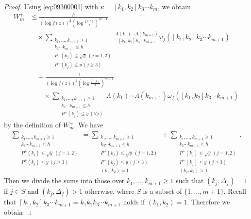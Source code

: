 \documentclass[a4paper,11pt]{amsart}
\theoremstyle{definition}
\numberwithin{equation}{section}
\begin{document}
\begin{proof}
Using \eqref{eq:09300001} with $\kappa=[k_1,k_2]k_3 \cdots k_m$, we obtain
\begin{align*}
W_m^+
&\leq \frac{h}{(\log{f(z)})^2 \left(\log{\frac{f(z)}{x}}\right)^{m-1}} \\
&\quad \times
\sum_{\substack{k_1,\ldots,k_{m+1} \geq 1 \\ [k_1,k_2]k_3 \cdots k_{m+1} \leq h \\ P^+(k_j) \leq \sqrt{y} ~(j=1,2) \\ P^+(k_j) \leq y ~(j \geq 3)}} 
\frac{\Lambda(k_1) \cdots \Lambda(k_{m+1})}{[k_1,k_2] k_3 \cdots k_{m+1}} \omega_f([k_1,k_2] k_3 \cdots k_{m+1}) \nonumber\\
&\quad 
+ \frac{1}{(\log{f(z)})^2 \left(\log{\frac{f(z)}{x}}\right)^{m-1}} \nonumber\\
&\qquad \times
\sum_{\substack{k_1,\ldots,k_{m+1} \geq 1 \\ [k_1,k_2]k_3 \cdots k_{m+1} \leq h \\ P^+(k_j) \leq y ~(\forall j)}} 
\Lambda(k_1) \cdots \Lambda(k_{m+1}) \omega_f([k_1,k_2] k_3 \cdots k_{m+1}) \nonumber
\end{align*}
by the definition of $W_m^+$. 
We have
\begin{align*}
\sum_{\substack{k_1,\ldots,k_{m+1} \geq 1 \\ [k_1,k_2] k_3 \cdots k_{m+1} \leq h \\ P^+(k_j) \leq \sqrt{y} ~(j=1,2) \\ P^+(k_j) \leq y ~(j \geq 3)}} 
= \sum_{\substack{k_1,\ldots,k_{m+1} \geq 1 \\ [k_1,k_2] k_3 \cdots k_{m+1} \leq h \\ P^+(k_j) \leq \sqrt{y} ~(j=1,2) \\ P^+(k_j) \leq y ~(j \geq 3) \\ (k_1,k_2)=1}} 
+ \sum_{\substack{k_1,\ldots,k_{m+1} \geq 1 \\ [k_1,k_2] k_3 \cdots k_{m+1} \leq h \\ P^+(k_j) \leq \sqrt{y} ~(j=1,2) \\ P^+(k_j) \leq y ~(j \geq 3) \\ (k_1,k_2)>1}}.  
\end{align*}
Then we divide the sums into those over $k_1, \ldots, k_{m+1} \geq1$ such that $(k_j,\Delta_f)=1$ if $j \in S$ and $(k_j,\Delta_f)>1$ otherwise, where $S$ is a subset of $\{1,\ldots,m+1\}$. 
Recall that $[k_1,k_2] k_3 \cdots k_{m+1}=k_1k_2k_3 \cdots k_{m+1}$ holds if $(k_1,k_2)=1$. 
Therefore we obtain

\end{proof}
\end{document}
